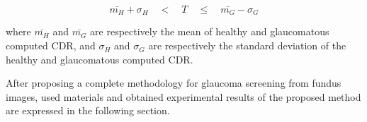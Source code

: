 \begin{equation}
    \bar{m_H}+\sigma_{H} \quad < \quad T \quad \leq \quad \bar{m_G}-\sigma_{G}
    \label{T}
\end{equation}

\noindent where $\bar{m_H}$ and $\bar{m_G}$ are respectively the mean of healthy and glaucomatous computed CDR, and $\sigma_{H}$ and $\sigma_{G}$ are respectively the standard deviation of the healthy and glaucomatous computed CDR.
\bigbreak

After proposing a complete methodology for glaucoma screening from fundus images, used materials and obtained experimental results of the proposed method are expressed in the following section.
